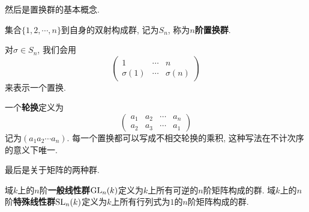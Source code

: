 然后是置换群的基本概念.
\begin{prop}
    集合$\{1,2,\cdots,n\}$到自身的双射构成群, 记为$S_n$, 称为{\bf $n$阶置换群}.
\end{prop}

\begin{sym}
    对$\sigma\in S_n$, 我们会用
    \[\begin{pmatrix}
        1 & \cdots & n\\
        \sigma(1) & \cdots & \sigma(n)
    \end{pmatrix}\]
    来表示一个置换.
\end{sym}

\begin{prop}
    一个{\bf 轮换}定义为
    \[\begin{pmatrix}
        a_1 & a_2 & \cdots & a_n\\
        a_2 & a_3 & \cdots & a_1
    \end{pmatrix}\]
    记为$(a_1a_2\cdots a_n)$.
    每一个置换都可以写成不相交轮换的乘积, 这种写法在不计次序的意义下唯一.
\end{prop}

最后是关于矩阵的两种群.
\begin{defn}
    域$k$上的$n$阶\textbf{一般线性群}$\operatorname{GL}_n(k)$定义为$k$上所有可逆的$n$阶矩阵构成的群.
    域$k$上的$n$阶\textbf{特殊线性群}$\operatorname{SL}_n(k)$定义为$k$上所有行列式为$1$的$n$阶矩阵构成的群.
\end{defn}